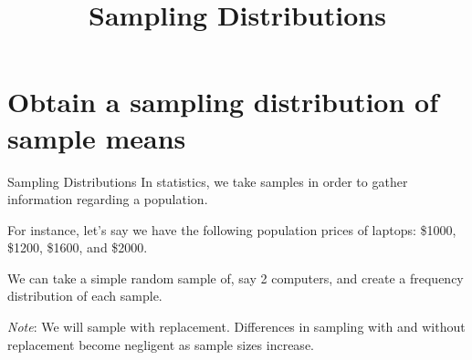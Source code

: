 \documentclass[t]{beamer}
\title{Sampling Distributions}
\author{}
\date{}
\begin{document}
\begin{frame} 
\maketitle
\end{frame}

\section{Obtain a sampling distribution of sample means}

\begin{frame}{Sampling Distributions}
In statistics, we take samples in order to gather information regarding a population. \newline\\	\pause

For instance, let's say we have the following population prices of laptops: \$1000, \$1200, \$1600, and \$2000.	\newline\\	\pause

We can take a simple random sample of, say 2 computers, and create a frequency distribution of each sample.	\newline\\	\pause

\emph{Note}: We will sample with replacement. Differences in sampling with and without replacement become negligent as sample sizes increase.
\end{frame}
\end{document}
